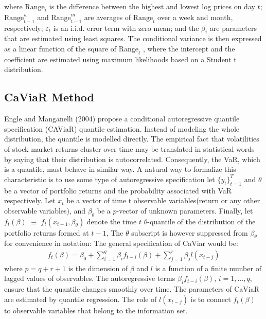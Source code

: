 \documentclass[a4paper,11pt,oneside]{book}
\begin{document}
where $\text{Range}_{t}$
is the difference between the highest and
lowest log prices on day $t$; $\text{Range}^{w}_{t-1}$
and $\text{Range}^{m}_{t-1}$ are
averages of $\text{Range}_{t}$ over a week and month, respectively;
$\varepsilon_t$
is an i.i.d. error term with zero mean; and the $\beta_{i}$
are parameters that are estimated using least squares.
The conditional variance is then expressed as a linear
function of the square of $\text{Range}_{t}$
, where the intercept and
the coefficient are estimated using maximum likelihoods
based on a Student t distribution.


\subsection{CaViaR Method}
Engle and Manganelli (2004) propose a conditional autoregressive quantile specification (CAViaR) quantile estimation. Instead of modeling the whole distribution, the quantile is modelled directly. The empirical fact that volatilities of stock market returns cluster over time may be translated in statistical words by saying that their distribution is autocorrelated. Consequently, the VaR, which is a quantile, must behave in similar way. A natural way to formalize this characteristic is to use some type of autoregressive specification
\newline\newline
let $\{y_t\}^T_{t=1}$ and $\theta$ be a vector of portfolio returns and the probability associated with VaR respectively. Let $x_t$ be a vector of time t observable variables(return or any other observable variables), and ${\beta}_\theta$ be a $p$-vector of unknown parameters. Finally, let $f_t(\beta) $ $\equiv$ $ f_t(x_{t-1},{\beta}_\theta)$ denote the time $t$ $\theta$-quantile of the distribution of the portfolio returns formed at $t-1$, The $\theta$ subscript is however suppressed from $\beta_\theta$ for convenience in notation: The general specification of CaViar would be:
\begin{equation}
\begin{aligned}
f_t(\beta)=\beta_0 + \sum_{i=1}^{q} \beta_{i}f _{t-i}(\beta) +\sum_{j=1}^{r}\beta_{j}l(x_{t-j})
\label{5}
\end{aligned}
\end{equation}
where $p=q+r+1$ is the dimension of $\beta$ and $l$ is a function of a finite number of lagged values of observables. The autoregressive terms $\beta_{i}f_{t-i}(\beta)$, $i = 1,...,q$, ensure that the quantile changes smoothly over time. The parameters of CaViaR are estimated by quantile regression. The role of $l(x_{t-j})$ is to connect $f_{t}(\beta)$ to observable variables that belong to the information set.
\end{document}
